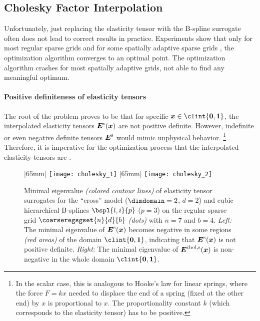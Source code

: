 \subsection{Cholesky Factor Interpolation}
\label{sec:623cholesky}

Unfortunately, just replacing the elasticity tensor with
the B-spline surrogate often does not lead to correct results in practice.
Experiments show that only for most regular sparse grids and
for some spatially adaptive sparse grids \cite{Valentin16Hierarchical},
the optimization algorithm converges to an optimal point.
The optimization algorithm crashes for most spatially adaptive grids,
not able to find any meaningful optimum.

\paragraph{Positive definiteness of elasticity tensors}

The root of the problem proves to be that for specific
$\*x \in \clint{\*0, \*1}$,
the interpolated elasticity tensors ${\boldsymbol{E}}^{\mathrm{s}}({\boldsymbol{x}})$ are not
positive definite.
However, indefinite or even negative definite tensors ${\boldsymbol{E}}^{\mathrm{s}}$
would mimic unphysical behavior.%
\footnote{%
  In the scalar case, this is analogous to Hooke's law for linear springs,
  where the force $F = kx$ needed to displace the end of a spring
  (fixed at the other end) by $x$ is proportional to $x$.
  The proportionality constant $k$ (which corresponds to the elasticity tensor)
  has to be positive.%
}
Therefore, it is imperative for the optimization process that
the interpolated elasticity tensors are \spd.

\blindtext{}

\begin{figure}
  [65mm]{%
    \texttt{[image: cholesky\_1]}%
  }%
  \hfill%
  [65mm]{%
    \texttt{[image: cholesky\_2]}%
  }%
  \hfill\hfill%
  \caption[%
    Minimal eigenvalue of interpolated elasticity tensors%
  ]{%
    Minimal eigenvalue \emph{(colored contour lines)}
    of elasticity tensor surrogates
    for the ``cross'' model ($\dimdomain = 2$, $d = 2$)
    and cubic hierarchical B-splines $\bspl{l,i}{p}$ ($p = 3$) on
    the regular sparse grid $\coarseregsgset{n}{d}{b}$ \emph{(dots)}
    with $n = 7$ and $b = 4$.
    \emph{Left:} The minimal eigenvalue of ${\boldsymbol{E}}^{\mathrm{s}}({\boldsymbol{x}})$
    becomes negative in some regions \emph{\textcolor{C1}{(red areas)}}
    of the domain $\clint{\*0, \*1}$,
    indicating that ${\boldsymbol{E}}^{\mathrm{s}}({\boldsymbol{x}})$ is not positive definite.
    \emph{Right:} The minimal eigenvalue of ${\boldsymbol{E}}^{\mathrm{chol},\mathrm{s}}({\boldsymbol{x}})$
    is non-negative in the whole domain $\clint{\*0, \*1}$.%
  }%
  \label{fig:cholesky}%
\end{figure}

